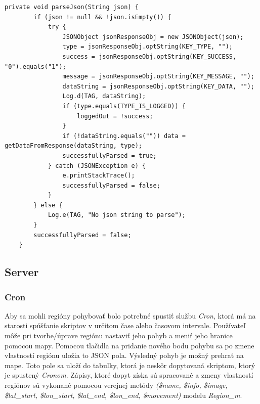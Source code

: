 \lstset{language=Java,
basicstyle=\tiny
}        
\begin{lstlisting}[frame=single]
 private void parseJson(String json) {
        if (json != null && !json.isEmpty()) {
            try {
                JSONObject jsonResponseObj = new JSONObject(json);
                type = jsonResponseObj.optString(KEY_TYPE, "");
                success = jsonResponseObj.optString(KEY_SUCCESS, "0").equals("1");
                message = jsonResponseObj.optString(KEY_MESSAGE, "");
                dataString = jsonResponseObj.optString(KEY_DATA, "");
                Log.d(TAG, dataString);
                if (type.equals(TYPE_IS_LOGGED)) {
                    loggedOut = !success;
                }
                if (!dataString.equals("")) data = getDataFromResponse(dataString, type);
                successfullyParsed = true;
            } catch (JSONException e) {
                e.printStackTrace();
                successfullyParsed = false;
            }
        } else {
            Log.e(TAG, "No json string to parse");
        }
        successfullyParsed = false;
    }
\end{lstlisting}

\subsection{Server}
\subsubsection{Cron}
Aby sa mohli regióny pohybovať bolo potrebné spustiť službu \emph{Cron}, ktorá má na starosti spúšťanie skriptov v určitom čase alebo časovom intervale. Používateľ môže pri tvorbe/úprave regiónu nastaviť jeho pohyb a meniť jeho hranice pomocou mapy. Pomocou tlačidla na pridanie nového bodu pohybu sa po zmene vlastností regiónu uložia to JSON pola. Výsledný pohyb je možný prehrať na mape. Toto pole sa uloží do tabuľky, ktorá je neskôr dopytovaná skriptom, ktorý je spustený \emph{Cronom}. Zápisy, ktoré dopyt získa sú spracované a zmeny vlastností regiónov sú vykonané pomocou verejnej metódy \emph{(\$name, \$info, \$image, \$lat\_start, \$lon\_start, \$lat\_end, \$lon\_end, \$movement)} modelu \emph{Region\_m}.



